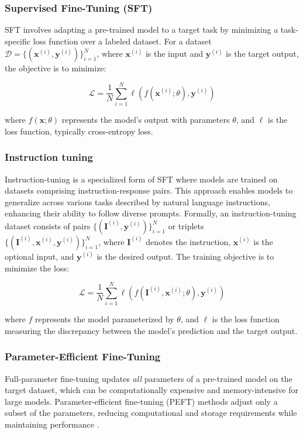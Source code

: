 \subsubsection{Supervised Fine-Tuning (SFT)}\label{app:sft}

SFT involves adapting a pre-trained model to a target task by minimizing a task-specific loss function over a labeled dataset. For a dataset \( \mathcal{D} = \{(\mathbf{x}^{(i)}, \mathbf{y}^{(i)})\}_{i=1}^N \), where \( \mathbf{x}^{(i)} \) is the input and \( \mathbf{y}^{(i)} \) is the target output, the objective is to minimize:

\begin{equation}
\mathcal{L} = \frac{1}{N} \sum_{i=1}^N \ell(f(\mathbf{x}^{(i)}; \theta), \mathbf{y}^{(i)})
\end{equation}

where \( f(\mathbf{x}; \theta) \) represents the model's output with parameters \( \theta \), and \( \ell \) is the loss function, typically cross-entropy loss.

\subsubsection{Instruction tuning} \label{app:instruction-tuning-it}

Instruction-tuning is a specialized form of SFT  where models are trained on datasets comprising instruction-response pairs. This approach enables models to generalize across various tasks described by natural language instructions, enhancing their ability to follow diverse prompts. Formally, an instruction-tuning dataset consists of pairs \( \{(\mathbf{I}^{(i)}, \mathbf{y}^{(i)})\}_{i=1}^N \) or triplets \( \{(\mathbf{I}^{(i)}, \mathbf{x}^{(i)}, \mathbf{y}^{(i)})\}_{i=1}^N \), where \( \mathbf{I}^{(i)} \) denotes the instruction, \( \mathbf{x}^{(i)} \) is the optional input, and \( \mathbf{y}^{(i)} \) is the desired output. The training objective is to minimize the loss:

\begin{equation}
\mathcal{L} = \frac{1}{N} \sum_{i=1}^N \ell(f(\mathbf{I}^{(i)}, \mathbf{x}^{(i)}; \theta), \mathbf{y}^{(i)})
\end{equation}

where \( f \) represents the model parameterized by \( \theta \), and \( \ell \) is the loss function measuring the discrepancy between the model's prediction and the target output.

\subsubsection{Parameter-Efficient Fine-Tuning} \label{app:peft}
Full-parameter fine-tuning updates \textit{all} parameters of a pre-trained model on the target dataset, which can be computationally expensive and memory-intensive for large models. Parameter-efficient fine-tuning (PEFT) methods adjust only a subset of the parameters, reducing computational and storage requirements while maintaining performance \citep{XuPARAMETEREFFICIENT2023}.

